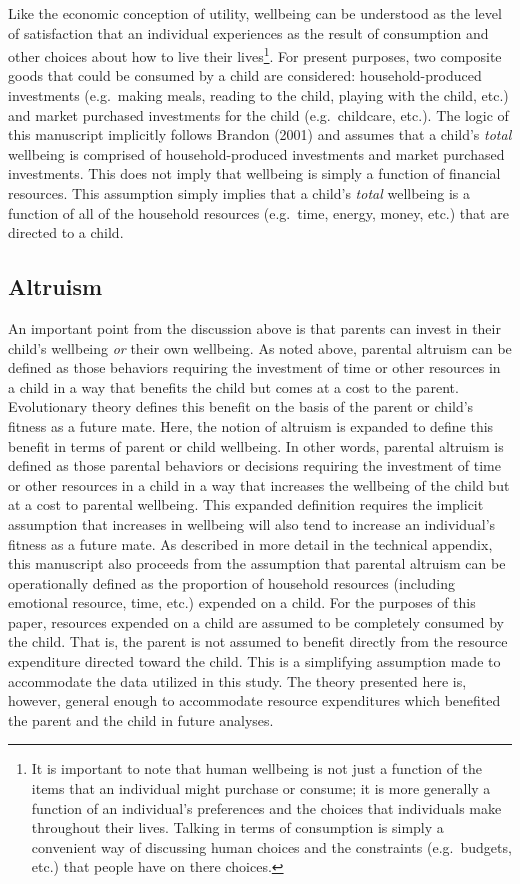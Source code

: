 \documentclass[review]{elsarticle}\usepackage[]{graphicx}\usepackage[]{color}
\begin{document}
Like the economic conception of utility, wellbeing can be understood as
the level of satisfaction that an individual experiences as the result
of consumption and other choices about how to live their lives\footnote{It
  is important to note that human wellbeing is not just a function of
  the items that an individual might purchase or consume; it is more
  generally a function of an individual's preferences and the choices
  that individuals make throughout their lives. Talking in terms of
  consumption is simply a convenient way of discussing human choices and
  the constraints (e.g.~budgets, etc.) that people have on there
  choices.}. For present purposes, two composite goods that could be
consumed by a child are considered: household-produced investments
(e.g.~making meals, reading to the child, playing with the child, etc.)
and market purchased investments for the child (e.g.~childcare, etc.).
The logic of this manuscript implicitly follows Brandon (2001) and
assumes that a child's \emph{total} wellbeing is comprised of
household-produced investments and market purchased investments. This
does not imply that wellbeing is simply a function of financial
resources. This assumption simply implies that a child's \emph{total}
wellbeing is a function of all of the household resources (e.g.~time,
energy, money, etc.) that are directed to a child.

\subsection{Altruism}\label{altruism}

An important point from the discussion above is that parents can invest
in their child's wellbeing \emph{or} their own wellbeing. As noted
above, parental altruism can be defined as those behaviors requiring the
investment of time or other resources in a child in a way that benefits
the child but comes at a cost to the parent. Evolutionary theory defines
this benefit on the basis of the parent or child's fitness as a future
mate. Here, the notion of altruism is expanded to define this benefit in
terms of parent or child wellbeing. In other words, parental altruism is
defined as those parental behaviors or decisions requiring the
investment of time or other resources in a child in a way that increases
the wellbeing of the child but at a cost to parental wellbeing. This
expanded definition requires the implicit assumption that increases in
wellbeing will also tend to increase an individual's fitness as a future
mate. As described in more detail in the technical appendix, this
manuscript also proceeds from the assumption that parental altruism can
be operationally defined as the proportion of household resources
(including emotional resource, time, etc.) expended on a child. For the
purposes of this paper, resources expended on a child are assumed to be
completely consumed by the child. That is, the parent is not assumed to
benefit directly from the resource expenditure directed toward the
child. This is a simplifying assumption made to accommodate the data
utilized in this study. The theory presented here is, however, general
enough to accommodate resource expenditures which benefited the parent
and the child in future analyses.
\end{document}
